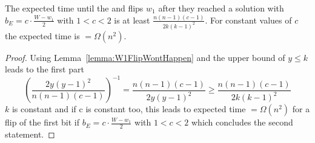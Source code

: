 \begin{corollary}\label{corollary:W1FlipWontHappen}
      The expected time until the \RLSR[k] and \RLSN[k] flips $w_1$ after they reached a solution with $b_E = c\cdot\frac{W-w_1}{2}$ with $1<c<2$ is at least \(\frac{n(n-1)(c-1)}{2k{(k-1)}^2}\). For constant values of $c$ the expected time is $=\Omega(n^2)$.
\end{corollary}
\begin{proof}
      Using Lemma~\ref{lemma:W1FlipWontHappen} and the upper bound of $y\le k$ leads to the first part
      \[ {(\frac{2y{(y-1)}^2}{n(n-1)(c-1)})}^{-1}=\frac{n(n-1)(c-1)}{2y{(y-1)}^2} \ge\frac{n(n-1)(c-1)}{2k{(k-1)}^2}\]
      $k$ is constant and if c is constant too, this leads to expected time $=\Omega(n^2)$ for a flip of the first bit if $b_E = c\cdot\frac{W-w_1}{2}$ with $1<c<2$ which concludes the second statement.
\end{proof}

